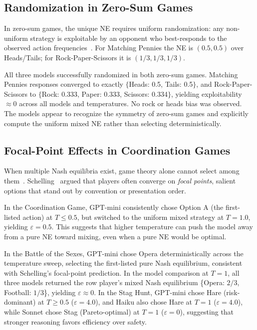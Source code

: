\documentclass[10pt,twocolumn]{article}
\begin{document}
\subsection{Randomization in Zero-Sum Games}

In zero-sum games, the unique NE requires uniform randomization: any
non-uniform strategy is exploitable by an opponent who best-responds to
the observed action frequencies~\cite{vonneumann1928}.
For Matching Pennies the NE is $(0.5, 0.5)$ over Heads/Tails; for
Rock-Paper-Scissors it is $(1/3, 1/3, 1/3)$.

All three models successfully randomized in both zero-sum games.
Matching Pennies responses converged to exactly $\{$Heads: 0.5, Tails: 0.5$\}$,
and Rock-Paper-Scissors to $\{$Rock: 0.333, Paper: 0.333, Scissors: 0.334$\}$,
yielding exploitability $\approx 0$ across all models and temperatures.
No rock or heads bias was observed.
The models appear to recognize the symmetry of zero-sum games and explicitly
compute the uniform mixed NE rather than selecting deterministically.

\subsection{Focal-Point Effects in Coordination Games}

When multiple Nash equilibria exist, game theory alone cannot select among
them~\cite{nash1950equilibrium}.
Schelling~\cite{schelling1960} argued that players often converge on
\emph{focal points}, salient options that stand out by convention or
presentation order.

In the Coordination Game, GPT-mini consistently chose Option A (the first-listed
action) at $T \leq 0.5$, but switched to the uniform mixed strategy at $T{=}1.0$,
yielding $\varepsilon = 0.5$.
This suggests that higher temperature can push the model away from a pure NE toward
mixing, even when a pure NE would be optimal.

In the Battle of the Sexes, GPT-mini chose Opera deterministically across the
temperature sweep, selecting the first-listed pure Nash equilibrium, consistent
with Schelling's focal-point prediction.
In the model comparison at $T{=}1$, all three models returned the row player's
mixed Nash equilibrium \{Opera: $2/3$, Football: $1/3$\}, yielding $\varepsilon
\approx 0$.
In the Stag Hunt, GPT-mini chose Hare (risk-dominant) at $T \geq 0.5$
($\varepsilon = 4.0$), and Haiku also chose Hare at $T{=}1$ ($\varepsilon = 4.0$),
while Sonnet chose Stag (Pareto-optimal) at $T{=}1$ ($\varepsilon = 0$),
suggesting that stronger reasoning favors efficiency over safety.
\end{document}
